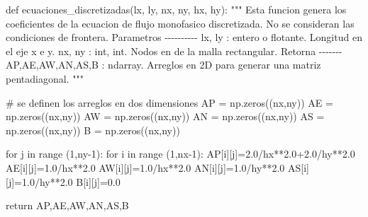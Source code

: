 \documentclass[
  letterpaper,
  DIV=11,
  numbers=noendperiod]{scrreprt}
\newenvironment{Shaded}{\begin{snugshade}}{\end{snugshade}}
\newcommand{\BuiltInTok}[1]{\textcolor[rgb]{0.00,0.23,0.31}{#1}}
\newcommand{\CommentTok}[1]{\textcolor[rgb]{0.37,0.37,0.37}{#1}}
\newcommand{\ControlFlowTok}[1]{\textcolor[rgb]{0.00,0.23,0.31}{#1}}
\newcommand{\DecValTok}[1]{\textcolor[rgb]{0.68,0.00,0.00}{#1}}
\newcommand{\FloatTok}[1]{\textcolor[rgb]{0.68,0.00,0.00}{#1}}
\newcommand{\KeywordTok}[1]{\textcolor[rgb]{0.00,0.23,0.31}{#1}}
\newcommand{\NormalTok}[1]{\textcolor[rgb]{0.00,0.23,0.31}{#1}}
\newcommand{\OperatorTok}[1]{\textcolor[rgb]{0.37,0.37,0.37}{#1}}
\begin{document}
\begin{Shaded}
\begin{Highlighting}[]
\KeywordTok{def}\NormalTok{ ecuaciones\_discretizadas(lx, ly, nx, ny, hx, hy):}
    \CommentTok{"""}
\CommentTok{    Esta funcion genera los coeficientes de la ecuacion de flujo monofasico discretizada. No se consideran las}
\CommentTok{    condiciones de frontera.}
\CommentTok{    Parametros}
\CommentTok{    {-}{-}{-}{-}{-}{-}{-}{-}{-}{-}}
\CommentTok{    lx, ly : entero o flotante.}
\CommentTok{        Longitud en el eje x e y.}
\CommentTok{    nx, ny : int, int.}
\CommentTok{        Nodos en de la malla rectangular.}
\CommentTok{    Retorna}
\CommentTok{    {-}{-}{-}{-}{-}{-}{-}}
\CommentTok{    AP,AE,AW,AN,AS,B : ndarray. }
\CommentTok{        Arreglos en 2D para generar una matriz pentadiagonal.}
\CommentTok{    """}
    
    \CommentTok{\# se definen los arreglos en dos dimensiones}
\NormalTok{    AP }\OperatorTok{=}\NormalTok{ np.zeros((nx,ny)) }
\NormalTok{    AE }\OperatorTok{=}\NormalTok{ np.zeros((nx,ny))}
\NormalTok{    AW }\OperatorTok{=}\NormalTok{ np.zeros((nx,ny))}
\NormalTok{    AN }\OperatorTok{=}\NormalTok{ np.zeros((nx,ny))}
\NormalTok{    AS }\OperatorTok{=}\NormalTok{ np.zeros((nx,ny))}
\NormalTok{    B }\OperatorTok{=}\NormalTok{ np.zeros((nx,ny))}
    
    \ControlFlowTok{for}\NormalTok{ j }\KeywordTok{in} \BuiltInTok{range}\NormalTok{ (}\DecValTok{1}\NormalTok{,ny}\OperatorTok{{-}}\DecValTok{1}\NormalTok{):}
        \ControlFlowTok{for}\NormalTok{ i }\KeywordTok{in} \BuiltInTok{range}\NormalTok{ (}\DecValTok{1}\NormalTok{,nx}\OperatorTok{{-}}\DecValTok{1}\NormalTok{):}
\NormalTok{            AP[i][j]}\OperatorTok{=}\FloatTok{2.0}\OperatorTok{/}\NormalTok{hx}\OperatorTok{**}\FloatTok{2.0}\OperatorTok{+}\FloatTok{2.0}\OperatorTok{/}\NormalTok{hy}\OperatorTok{**}\FloatTok{2.0}
\NormalTok{            AE[i][j]}\OperatorTok{=}\FloatTok{1.0}\OperatorTok{/}\NormalTok{hx}\OperatorTok{**}\FloatTok{2.0}
\NormalTok{            AW[i][j]}\OperatorTok{=}\FloatTok{1.0}\OperatorTok{/}\NormalTok{hx}\OperatorTok{**}\FloatTok{2.0}
\NormalTok{            AN[i][j]}\OperatorTok{=}\FloatTok{1.0}\OperatorTok{/}\NormalTok{hy}\OperatorTok{**}\FloatTok{2.0}
\NormalTok{            AS[i][j]}\OperatorTok{=}\FloatTok{1.0}\OperatorTok{/}\NormalTok{hy}\OperatorTok{**}\FloatTok{2.0}
\NormalTok{            B[i][j]}\OperatorTok{=}\FloatTok{0.0}

    \ControlFlowTok{return}\NormalTok{ AP,AE,AW,AN,AS,B}
\end{Highlighting}
\end{Shaded}
\end{document}
